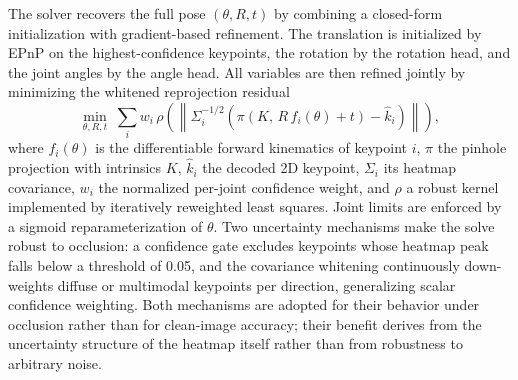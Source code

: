 The solver recovers the full pose $(\theta, R, t)$ by combining a closed-form initialization with gradient-based refinement. The translation is initialized by EPnP \cite{lepetit2009ep} on the highest-confidence keypoints, the rotation by the rotation head, and the joint angles by the angle head. All variables are then refined jointly by minimizing the whitened reprojection residual \cite{hartley2003multiple}
\begin{equation}
\min_{\theta, R, t}\; \sum_{i} w_i\, \rho\!\left( \left\| \Sigma_i^{-1/2}\left( \pi\!\left(K,\, R\, f_i(\theta) + t\right) - \hat{k}_i \right) \right\| \right),
\end{equation}
where $f_i(\theta)$ is the differentiable forward kinematics of keypoint $i$, $\pi$ the pinhole projection with intrinsics $K$, $\hat{k}_i$ the decoded 2D keypoint, $\Sigma_i$ its heatmap covariance, $w_i$ the normalized per-joint confidence weight, and $\rho$ a robust kernel implemented by iteratively reweighted least squares. Joint limits are enforced by a sigmoid reparameterization of $\theta$. Two uncertainty mechanisms make the solve robust to occlusion: a confidence gate excludes keypoints whose heatmap peak falls below a threshold of 0.05, and the covariance whitening continuously down-weights diffuse or multimodal keypoints per direction, generalizing scalar confidence weighting. Both mechanisms are adopted for their behavior under occlusion rather than for clean-image accuracy; their benefit derives from the uncertainty structure of the heatmap itself rather than from robustness to arbitrary noise.

